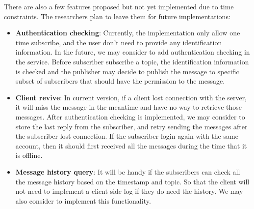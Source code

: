 There are also a few features proposed but not yet implemented due to time constraints. The researchers plan to leave them for future implementations:

\begin{itemize}
    \item \textbf{Authentication checking}: Currently, the implementation only allow one time subscribe, and the user don't need to provide any identification information. In the future, we may consider to add authentication checking in the service. Before subscriber subscribe a topic, the identification information is checked and the publisher may decide to publish the message to specific subset of subscribers that should have the permission to the message.
    \item \textbf{Client revive}: In current version, if a client lost connection with the server, it will miss the message in the meantime and have no way to retrieve those messages. After authentication checking is implemented, we may consider to store the last reply from the subscriber, and retry sending the messages after the subscriber lost connection. If the subscriber login again with the same account, then it should first received all the messages during the time that it is offline.
    \item \textbf{Message history query}: It will be handy if the subscribers can check all the message history based on the timestamp and topic. So that the client will not need to implement a client side log if they do need the history. We may also consider to implement this functionality.
\end{itemize}